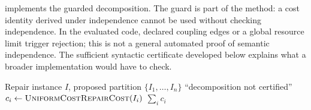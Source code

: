 \documentclass[11pt,a4paper]{article}
\begin{document}
 implements the guarded decomposition. The guard is part of the method: a cost identity derived under independence cannot be used without checking independence. In the evaluated code, declared coupling edges or a global resource limit trigger rejection; this is not a general automated proof of semantic independence. The sufficient syntactic certificate developed below explains what a broader implementation would have to check.
\begin{algorithm}[H]\caption{Guarded component-wise exact repair}\label{alg:decomp}
\begin{algorithmic}[1]
\Require Repair instance $I$, proposed partition $\{I_1,\ldots,I_n\}$
  \State \Return ``decomposition not certified''
\EndIf
{}
  \State $c_i\gets\Call{UniformCostRepairCost}{I_i}$
\EndFor
\State \Return $\sum_i c_i$
\end{algorithmic}
\end{algorithm}
\end{document}
